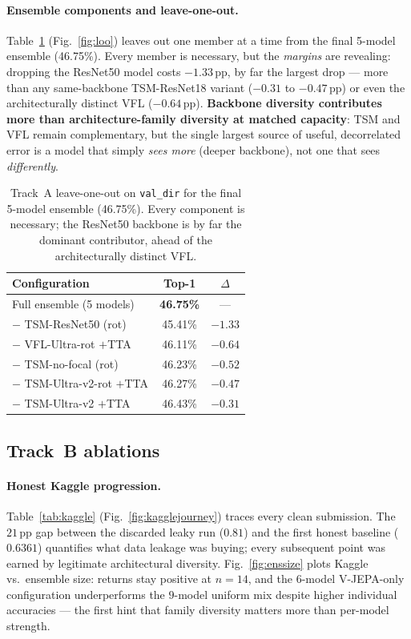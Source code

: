 \documentclass[10pt,twocolumn,letterpaper]{article}
\begin{document}
\paragraph{Ensemble components and leave-one-out.}
\label{sec:loo}
Table~\ref{tab:loo} (Fig.~\ref{fig:loo}) leaves out one member at a time from
the final 5-model ensemble (46.75\%). Every member is necessary, but the
\emph{margins} are revealing: dropping the ResNet50 model costs $-1.33$\,pp,
by far the largest drop --- more than any same-backbone TSM-ResNet18 variant
($-0.31$ to $-0.47$\,pp) or even the architecturally distinct VFL
($-0.64$\,pp). \textbf{Backbone diversity contributes more than
architecture-family diversity at matched capacity}: TSM and VFL remain
complementary, but the single largest source of useful, decorrelated error is
a model that simply \emph{sees more} (deeper backbone), not one that sees
\emph{differently}.

\begin{table}[t]
\centering\small
\begin{tabular}{@{}lcc@{}}
\toprule
Configuration & Top-1 & $\Delta$ \\
\midrule
Full ensemble (5 models)             & \textbf{46.75\%} & --- \\
\;$-$ TSM-ResNet50 (rot)             & 45.41\% & $-1.33$ \\
\;$-$ VFL-Ultra-rot $+$TTA           & 46.11\% & $-0.64$ \\
\;$-$ TSM-no-focal (rot)             & 46.23\% & $-0.52$ \\
\;$-$ TSM-Ultra-v2-rot $+$TTA        & 46.27\% & $-0.47$ \\
\;$-$ TSM-Ultra-v2 $+$TTA            & 46.43\% & $-0.31$ \\
\bottomrule
\end{tabular}
\caption{Track~A leave-one-out on \texttt{val\_dir} for the final 5-model
ensemble (46.75\%). Every component is necessary; the ResNet50 backbone is by
far the dominant contributor, ahead of the architecturally distinct VFL.}
\label{tab:loo}
\end{table}

\subsection{Track~B ablations}
\paragraph{Honest Kaggle progression.}
Table~\ref{tab:kaggle} (Fig.~\ref{fig:kagglejourney}) traces every clean
submission. The $21$\,pp gap between the discarded leaky run ($0.81$) and the
first honest baseline ($0.6361$) quantifies what data leakage was buying;
every subsequent point was earned by legitimate architectural diversity.
Fig.~\ref{fig:enssize} plots Kaggle vs.\ ensemble size: returns stay positive
at $n{=}14$, and the $6$-model V-JEPA-only configuration underperforms the
$9$-model uniform mix despite higher individual accuracies --- the first hint
that family diversity matters more than per-model strength.
\end{document}
